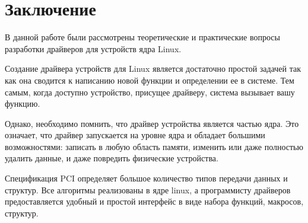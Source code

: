 \newpage
\section*{Заключение}

В данной работе были рассмотрены теоретические и практические вопросы разработки драйверов для устройств ядра Linux.

Создание драйвера устройств для Linux является достаточно простой задачей так как она сводится к написанию новой функции и определении ее в системе. Тем самым, когда доступно устройство, присущее драйверу, система вызывает вашу функцию.

Однако, необходимо помнить, что драйвер устройства является частью ядра. Это означает, что драйвер запускается на уровне ядра и обладает большими возможностями: записать в любую область памяти, изменить или даже полностью удалить данные, и даже повредить физические устройства. 

Спецификация  PCI определяет большое количество типов передачи данных и структур.  Все  алгоритмы реализованы в ядре linux, а программисту драйверов  предоставляется удобный и простой интерфейс в виде  набора  функций, макросов, структур.